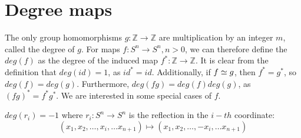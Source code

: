 \section{Degree maps}\label{sec-degree-maps}
The only group homomorphisms $g: \mathbb{Z} \rightarrow \mathbb{Z}$ are multiplication by an integer $m$, called the degree of $g$. For maps $f:S^n\rightarrow S^n,n>0$, we can therefore define the  $deg(f)$ as the degree of the induced map $f^*: \mathbb{Z}\rightarrow \mathbb{Z}$. It is clear from the definition that $deg(id)=1$, as $id^*=id$. Additionally, if $f\simeq g$, then $f^*=g^*$, so $deg(f)=deg(g)$. Furthermore, $deg(fg)=deg(f)deg(g)$, as $(fg)^*=f^*g^*$. We are interested in some special cases of $f$.

\begin{proposition}
$deg(r_i)=-1$ where $r_i:S^n\rightarrow S^n$ is the reflection in the $i-th$ coordinate:
$$(x_1,x_2,\dots,x_i,\dots x_{n+1})\mapsto (x_1,x_2,\dots,-x_i,\dots x_{n+1})$$
\end{proposition}
